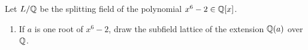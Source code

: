 \begin{problem}
Let $L/\mathbb{Q}$ be the splitting field of the polynomial $x^6-2\in\mathbb{Q}[x]$.
\begin{enumerate}[label=(\alph*)]
\item If $a$ is one root of $x^6-2$, draw the subfield lattice of the
  extension $\mathbb{Q}(a)$ over $\mathbb{Q}$.


\end{enumerate}
\end{problem}
